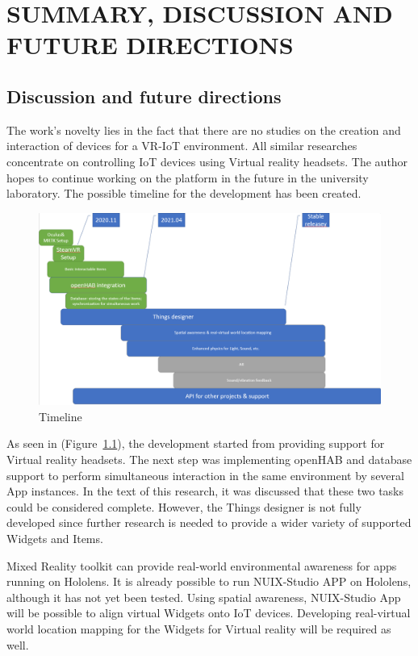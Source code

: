 
\chapter{SUMMARY, DISCUSSION AND FUTURE DIRECTIONS}

\section{Discussion and future directions}

The work's novelty lies in the fact that there are no studies on the creation and interaction of devices for a VR-IoT environment. All similar researches concentrate on controlling IoT devices using Virtual reality headsets.
The author hopes to continue working on the platform in the future in the university laboratory. The possible timeline for the development has been created.

\begin{figure}
  \centering
  \includegraphics[width=0.9\linewidth]{figures/Timeline.png}
  \caption{Timeline}
  \label{fig:Timeline-figure}
\end{figure}

As seen in (Figure~\ref{fig:Timeline-figure}), the development started from providing support for Virtual reality headsets. The next step was implementing openHAB and database support to perform simultaneous interaction in the same environment by several App instances. In the text of this research, it was discussed that these two tasks could be considered complete. However, the Things designer is not fully developed since further research is needed to provide a wider variety of supported Widgets and Items.

Mixed Reality toolkit can provide real-world environmental awareness for apps running on Hololens. It is already possible to run NUIX-Studio APP on Hololens, although it has not yet been tested. Using spatial awareness, NUIX-Studio App will be possible to align virtual Widgets onto IoT devices. Developing real-virtual world location mapping for the Widgets for Virtual reality will be required as well.

